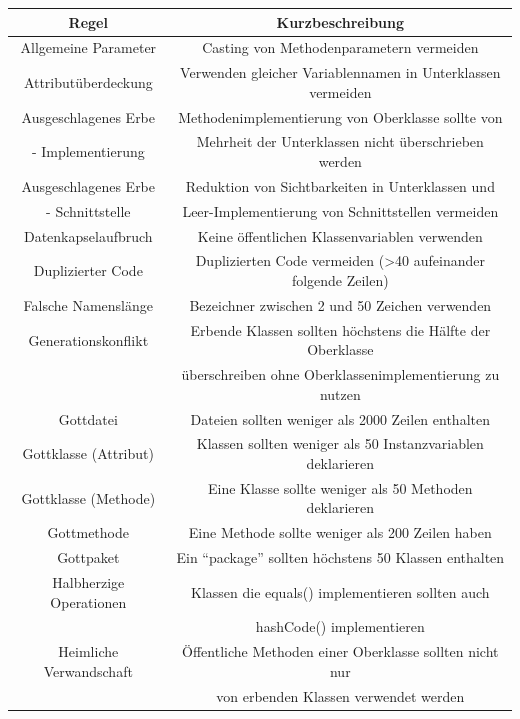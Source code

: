 \documentclass[da,ngerman]{stthesis}
\begin{document}
				\begin{center}
					\tabulinesep=1.5mm
					\begin{longtabu}{|c|c|}
						\hline
  						\textbf{Regel} & \textbf{Kurzbeschreibung}\\
  						\hline
						Allgemeine Parameter & Casting von Methodenparametern vermeiden \\
						\hline
						Attributüberdeckung & Verwenden gleicher Variablennamen in Unterklassen vermeiden \\
						\hline
						Ausgeschlagenes Erbe & Methodenimplementierung von Oberklasse sollte von \\ - Implementierung & Mehrheit der Unterklassen nicht überschrieben werden \\
						\hline
						Ausgeschlagenes Erbe & Reduktion von Sichtbarkeiten in Unterklassen und \\ - Schnittstelle & Leer-Implementierung von Schnittstellen vermeiden \\
						\hline
						Datenkapselaufbruch & Keine öffentlichen Klassenvariablen verwenden \\
						\hline
						Duplizierter Code & Duplizierten Code vermeiden (>40 aufeinander folgende Zeilen) \\
						\hline
						Falsche Namenslänge & Bezeichner zwischen 2 und 50 Zeichen verwenden \\
						\hline
						Generationskonflikt & Erbende Klassen sollten höchstens die Hälfte der Oberklasse \\ & überschreiben ohne Oberklassenimplementierung zu nutzen \\
						\hline
						Gottdatei & Dateien sollten weniger als 2000 Zeilen enthalten \\
						\hline
						Gottklasse (Attribut) & Klassen sollten weniger als 50 Instanzvariablen deklarieren \\
						\hline
						Gottklasse (Methode) & Eine Klasse sollte weniger als 50 Methoden deklarieren \\
						\hline
						Gottmethode & Eine Methode sollte weniger als 200 Zeilen haben \\
						\hline
						Gottpaket & Ein "`package"' sollten höchstens 50 Klassen enthalten \\
						\hline
						Halbherzige Operationen & Klassen die equals() implementieren sollten auch \\ &  hashCode() implementieren \\
						\hline
						Heimliche Verwandschaft & Öffentliche Methoden einer Oberklasse sollten nicht nur \\ & von erbenden Klassen verwendet werden \\

\end{longtabu}
\end{center}
\end{document}
